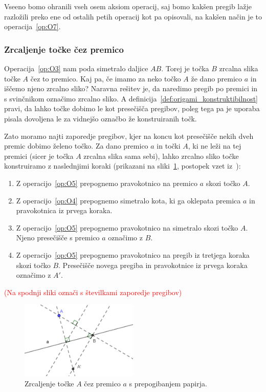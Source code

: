 Vseeno bomo ohranili vseh osem aksiom operacij, saj bomo kakšen pregib lažje razložili preko ene od ostalih petih operacij kot pa opisovali, na kakšen način je to operacija~\ref{op:O7}.

\subsubsection{Zrcaljenje točke čez premico}
\label{podpogl:zrcaljenje_origami}

Operacija~\ref{op:O3} nam poda simetralo daljice $AB$. Torej je točka $B$ zrcalna slika točke $A$ čez to premico. Kaj pa, če imamo za neko točko $A$ že dano premico $a$ in iščemo njeno zrcalno sliko? Naravna rešitev je, da naredimo pregib po premici in s svinčnikom označimo zrcalno sliko. A definicija~\ref{def:origami_konstruktibilnost} pravi, da lahko točke dobimo le kot presečišča pregibov, poleg tega pa je uporaba pisala dovoljena le za vidnejšo označbo že konstruiranih točk.

Zato moramo najti zaporedje pregibov, kjer na koncu kot presečišče nekih dveh premic dobimo želeno točko. Za dano premico $a$ in točki $A$, ki ne leži na tej premici (sicer je točka $A$ zrcalna slika sama sebi), lahko zrcalno sliko točke konstruiramo z naslednjimi koraki (prikazani na sliki~\ref{fig:zrcaljenje_cez_premico}, postopek vzet iz~\cite[str.\ 28]{hull2020}):
\begin{enumerate}
    \item Z operacijo~\ref{op:O5} prepognemo pravokotnico na premico $a$ skozi točko $A$.
    \item Z operacijo~\ref{op:O4} prepognemo simetralo kota, ki ga oklepata premica $a$ in pravokotnica iz prvega koraka.
    \item Z operacijo~\ref{op:O5} prepognemo pravokotnico na simetralo skozi točko $A$. Njeno presečišče s premico $a$ označimo z $B$.
    \item Z operacijo~\ref{op:O5} prepognemo pravokotnico na pregib iz tretjega koraka skozi točko $B$. Presečišče novega pregiba in pravokotnice iz prvega koraka označimo z $A'$.
\end{enumerate}
\textcolor{red}{(Na spodnji sliki označi s številkami zaporedje pregibov)}

\begin{figure}[h]
    \centering
    \includegraphics[width=0.5\textwidth]{images/zrcaljenje_tocke_cez_premico.png}
    \caption[Zrcaljenje čez premico]{Zrcaljenje točke $A$ čez premico $a$ s prepogibanjem papirja.}
    \label{fig:zrcaljenje_cez_premico}
\end{figure}

